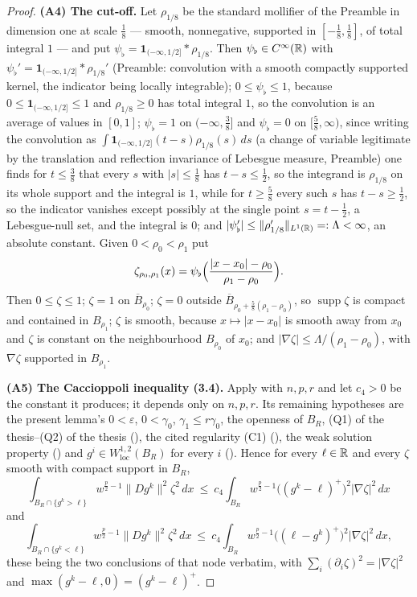 \begin{proof}
\textbf{(A4) The cut-off.}  Let $\rho_{1/8}$ be the standard mollifier of the
Preamble in dimension one at scale $\tfrac18$ --- smooth, nonnegative, supported
in $[-\tfrac18,\tfrac18]$, of total integral $1$ --- and put
$\psi_\flat=\mathbf1_{(-\infty,1/2]}*\rho_{1/8}$.  Then
$\psi_\flat\in C^\infty(\mathbb{R})$ with
$\psi_\flat'=\mathbf1_{(-\infty,1/2]}*\rho_{1/8}'$ (Preamble: convolution with a
smooth compactly supported kernel, the indicator being locally integrable);
$0\le\psi_\flat\le1$, because $0\le\mathbf1_{(-\infty,1/2]}\le1$ and
$\rho_{1/8}\ge0$ has total integral $1$, so the convolution is an average of
values in $[0,1]$; $\psi_\flat=1$ on $(-\infty,\tfrac38]$ and $\psi_\flat=0$ on
$[\tfrac58,\infty)$, since writing the convolution as
$\int\mathbf1_{(-\infty,1/2]}(t-s)\rho_{1/8}(s)\,ds$ (a change of variable
legitimate by the translation and reflection invariance of Lebesgue measure,
Preamble) one finds for $t\le\tfrac38$ that every $s$ with $|s|\le\tfrac18$ has
$t-s\le\tfrac12$, so the integrand is $\rho_{1/8}$ on its whole support and the
integral is $1$, while for $t\ge\tfrac58$ every such $s$ has $t-s\ge\tfrac12$,
so the indicator vanishes except possibly at the single point $s=t-\tfrac12$, a
Lebesgue-null set, and the integral is $0$; and
$|\psi_\flat'|\le\|\rho_{1/8}'\|_{L^1(\mathbb{R})}=:\Lambda<\infty$, an absolute
constant.  Given $0<\rho_0<\rho_1$ put
\[
\zeta_{\rho_0,\rho_1}(x)=\psi_\flat
\Bigl(\frac{|x-x_0|-\rho_0}{\rho_1-\rho_0}\Bigr).
\]
Then $0\le\zeta\le1$; $\zeta=1$ on $\overline B_{\rho_0}$; $\zeta=0$ outside
$\overline B_{\rho_0+\frac58(\rho_1-\rho_0)}$, so $\operatorname{supp}\zeta$ is
compact and contained in $B_{\rho_1}$; $\zeta$ is smooth, because
$x\mapsto|x-x_0|$ is smooth away from $x_0$ and $\zeta$ is constant on the
neighbourhood $B_{\rho_0}$ of $x_0$; and
$|\nabla\zeta|\le\Lambda/(\rho_1-\rho_0)$, with $\nabla\zeta$ supported in
$B_{\rho_1}$.

\textbf{(A5) The Caccioppoli inequality (3.4).}  Apply
 with $n,p,r$ and let $c_4>0$ be the constant it
produces; it depends only on $n,p,r$.  Its remaining hypotheses are the present
lemma's $0<\varepsilon$, $0<\gamma_0$, $\gamma_1\le r\gamma_0$, the openness of
$B_R$, (Q1) of the thesis--(Q2) of the thesis (), the cited
regularity (C1) (), the weak solution property
() and $g^i\in W^{1,2}_{\mathrm{loc}}(B_R)$ for every
$i$ ().  Hence for every $\ell\in\mathbb{R}$ and every $\zeta$
smooth with compact support in $B_R$,
\[
\int_{B_R\cap\{g^k>\ell\}}w^{\frac p2-1}\|Dg^k\|^2\zeta^2\,dx
\ \le\ c_4\int_{B_R}w^{\frac p2-1}\bigl((g^k-\ell)^+\bigr)^2|\nabla\zeta|^2\,dx
\tag{3.4$^+$}
\]
and
\[
\int_{B_R\cap\{g^k<\ell\}}w^{\frac p2-1}\|Dg^k\|^2\zeta^2\,dx
\ \le\ c_4\int_{B_R}w^{\frac p2-1}\bigl((\ell-g^k)^+\bigr)^2|\nabla\zeta|^2\,dx ,
\tag{3.4$^-$}
\]
these being the two conclusions of that node verbatim, with
$\sum_i(\partial_i\zeta)^2=|\nabla\zeta|^2$ and
$\max(g^k-\ell,0)=(g^k-\ell)^+$.


\end{proof}

